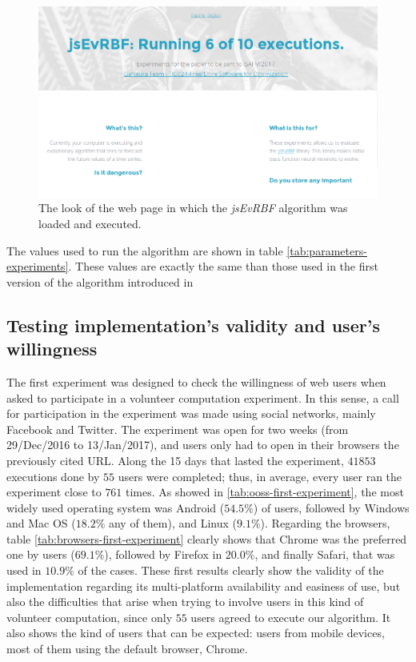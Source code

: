 \documentclass{article}
\begin{document}
\begin{figure}[!ht]
\includegraphics[width=120mm]{example-of-execution-isafm.png}
\caption{The look of the web page in which the {\em jsEvRBF} algorithm was loaded and executed.}
\label{fig:example-of-execution}
\end{figure}

The values used to run the algorithm are shown in table \ref{tab:parameters-experiments}. These values are exactly the same than those used in the first version of the algorithm introduced in \cite{rivas03:EvRBF}


\subsection{Testing implementation's validity and user's willingness}
\label{sec:first-experiment}
The first experiment was designed to check the willingness of web
users when asked to participate in a volunteer computation
experiment. In this sense, a call for participation in the experiment was
made using social networks, mainly Facebook and Twitter. The experiment was
open for two weeks (from 29/Dec/2016 to 13/Jan/2017), and users only
had to open in their browsers the previously cited URL.
Along the 15 days that lasted the experiment, $41853$ executions done
by $55$ users were completed; thus, in average, every user ran the
experiment close to
$761$ times. %
As showed in \ref{tab:ooss-first-experiment}, the most widely used operating system was Android
($54.5\%$) of users, followed by Windows and Mac OS ($18.2\%$ any of
them), and Linux ($9.1\%$). %
Regarding the browsers, table \ref{tab:browsers-first-experiment} clearly shows that Chrome was the
preferred one by users ($69.1\%$), followed by  Firefox in $20.0\%$, and
finally Safari, that was used in $10.9\%$ of the cases. These first
results clearly show the validity of the implementation regarding its
multi-platform availability and easiness of use, but also the
difficulties that arise when trying to involve users in this kind of
volunteer computation, since only $55$ users agreed to execute our
algorithm. It also shows the kind of users that can be expected:
users from mobile devices, most of them using the default browser,
Chrome.
\end{document}
